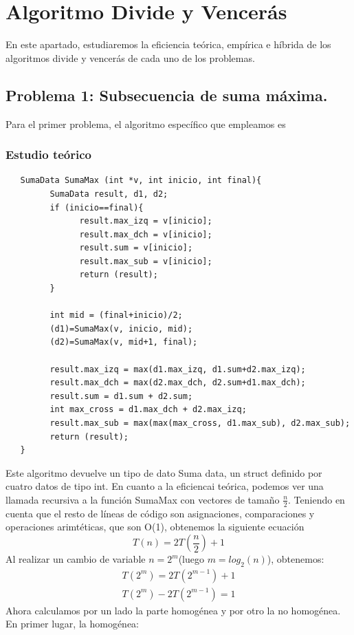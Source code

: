 \documentclass[11pt,openany]{book}
\begin{document}
\chapter{Algoritmo Divide y Vencerás}
En este apartado, estudiaremos la eficiencia teórica, empírica e híbrida de los algoritmos divide y vencerás
de cada uno de los problemas.
\section{Problema 1: Subsecuencia de suma máxima.}
Para el primer problema, el algoritmo específico que empleamos es
\subsection{Estudio teórico}
\begin{lstlisting}
   SumaData SumaMax (int *v, int inicio, int final){
         SumaData result, d1, d2;
         if (inicio==final){
               result.max_izq = v[inicio];
               result.max_dch = v[inicio];
               result.sum = v[inicio];
               result.max_sub = v[inicio];
               return (result);
         }

         int mid = (final+inicio)/2;
         (d1)=SumaMax(v, inicio, mid);
         (d2)=SumaMax(v, mid+1, final);
            
         result.max_izq = max(d1.max_izq, d1.sum+d2.max_izq);
         result.max_dch = max(d2.max_dch, d2.sum+d1.max_dch);
         result.sum = d1.sum + d2.sum;
         int max_cross = d1.max_dch + d2.max_izq;
         result.max_sub = max(max(max_cross, d1.max_sub), d2.max_sub);
         return (result);
   }
\end{lstlisting}
Este algoritmo devuelve un tipo de dato Suma data, un struct definido por cuatro datos de tipo int. En cuanto
a la eficiencai teórica, podemos ver una llamada recursiva a la función SumaMax con vectores de tamaño $\frac{n}{2}$.
Teniendo en cuenta que el resto de líneas de código son asignaciones, comparaciones y operaciones arimtéticas, que son O(1), obtenemos
la siguiente ecuación
\begin{equation*}
      T(n)=2T(\frac{n}{2})+1
\end{equation*}
Al realizar un cambio de variable $n=2^m$(luego $m=log_2(n)$), obtenemos:
\begin{gather*}
      T(2^m)=2T(2^{m-1})+1 \\
      T(2^m)-2T(2^{m-1})=1
\end{gather*}
Ahora calculamos por un lado la parte homogénea y por otro la no homogénea. En primer lugar, la homogénea:
\end{document}
